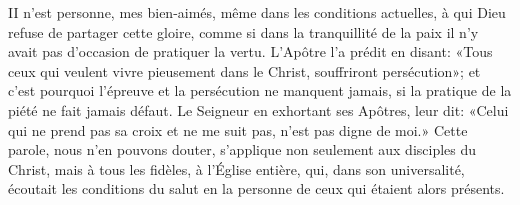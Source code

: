 II n’est personne, mes bien-aimés, même dans les conditions actuelles,
	à qui Dieu refuse de partager cette gloire,
	comme si dans la tranquillité de la paix
	il n’y avait pas d’occasion de pratiquer la vertu.
L’Apôtre l’a prédit en disant:
	«Tous ceux qui veulent vivre pieusement dans le Christ,
		souffriront persécution»;
	et c’est pourquoi l’épreuve et la persécution ne manquent jamais,
	si la pratique de la piété ne fait jamais défaut.
Le Seigneur en exhortant ses Apôtres, leur dit:
	«Celui qui ne prend pas sa croix et ne me suit pas,
	n’est pas digne de moi.»
Cette parole, nous n’en pouvons douter,
	s’applique non seulement aux disciples du Christ,
	mais à tous les fidèles, à l’Église entière,
	qui, dans son universalité, écoutait les conditions du salut
	en la personne de ceux qui étaient alors présents.
